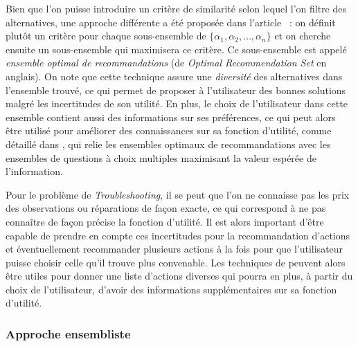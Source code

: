 \documentclass[a4paper,11pt]{article}
\theoremstyle{plain}
\theoremstyle{definition}
\begin{document}
Bien que l'on puisse introduire un critère de similarité selon lequel l'on filtre des alternatives, une approche différente a été proposée dans l'article \cite{price_optimal_2005}~: on définit plutôt un critère pour chaque sous-ensemble de $\{\alpha_1, \alpha_2, \dotsc, \alpha_n\}$ et on cherche ensuite un sous-ensemble qui maximisera ce critère. Ce sous-ensemble est appelé \emph{ensemble optimal de recommandations} (de \emph{Optimal Recommendation Set} en anglais). On note que cette technique assure une \emph{diversité} des alternatives dans l'ensemble trouvé, ce qui permet de proposer à l'utilisateur des bonnes solutions malgré les incertitudes de son utilité. En plus, le choix de l'utilisateur dans cette ensemble contient aussi des informations sur ses préférences, ce qui peut alors être utilisé pour améliorer des connaissances sur sa fonction d'utilité, comme détaillé dans \cite{viappiani_optimal_2005}, qui relie les ensembles optimaux de recommandations avec les ensembles de questions à choix multiples maximisant la valeur espérée de l'information. %

Pour le problème de \emph{Troubleshooting}, il se peut que l'on ne connaisse pas les prix des observations ou réparations de façon exacte, ce qui correspond à ne pas connaître de façon précise la fonction d'utilité. Il est alors important d'être capable de prendre en compte ces incertitudes pour la recommandation d'actions et éventuellement recommander plusieurs actions à la fois pour que l'utilisateur puisse choisir celle qu'il trouve plus convenable. Les techniques de \cite{price_optimal_2005, viappiani_optimal_2005} peuvent alors être utiles pour donner une liste d'actions diverses qui pourra en plus, à partir du choix de l'utilisateur, d'avoir des informations supplémentaires sur sa fonction d'utilité.

\subsubsection{Approche ensembliste}
\end{document}
